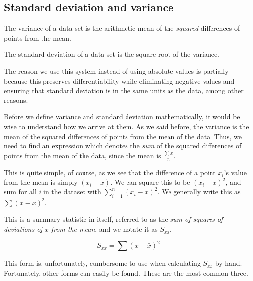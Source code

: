 \subsection{Standard deviation and variance}

\begin{tcolorbox}
    \begin{definition}
        The variance of a data set is the arithmetic mean of the \emph{squared} differences of points from the mean.
    \end{definition}
    \begin{definition}
        The standard deviation of a data set is the square root of the variance.
    \end{definition}
\end{tcolorbox}

The reason we use this system instead of using absolute values is partially because this preserves differentiability while eliminating negative values and ensuring that standard deviation is in the same units as the data, among other reasons.

Before we define variance and standard deviation mathematically, it would be wise to understand how we arrive at them. As we said before, the variance is the mean of the squared differences of points from the mean of the data. Thus, we need to find an expression which denotes the \textit{sum} of the squared differences of points from the mean of the data, since the mean is $\frac{\sum x}{n}$.

This is quite simple, of course, as we see that the difference of a point $x_i$'s value from the mean is simply $(x_i - \bar{x})$. We can square this to be $(x_i - \bar{x})^2$, and sum for all $i$ in the dataset with $\sum_{i=1}^n (x_i - \bar{x})^2$. We generally write this as $\sum (x - \bar{x})^2$.

This is a summary statistic in itself, referred to as the \textit{sum of squares of deviations of $x$ from the mean}, and we notate it as $S_{xx}$.

\begin{tcolorbox}
    \begin{definition}
        $$S_{xx} = \sum (x - \bar{x})^2$$
    \end{definition}
\end{tcolorbox}

This form is, unfortunately, cumbersome to use when calculating $S_{xx}$ by hand. Fortunately, other forms can easily be found. These are the most common three.

